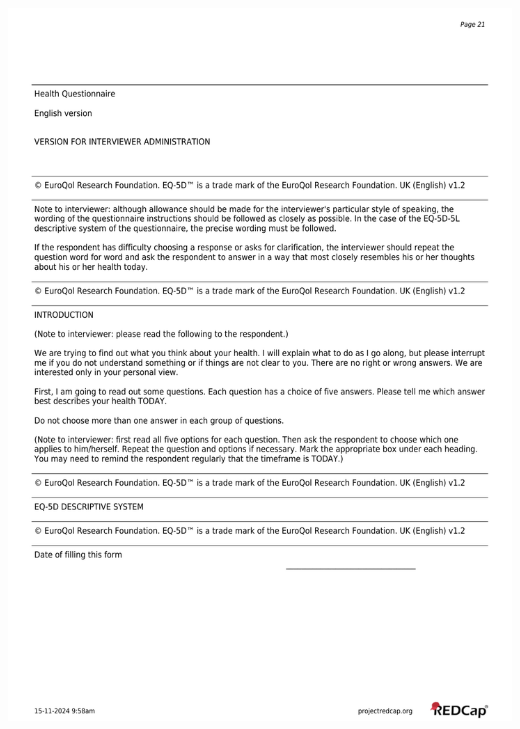 \documentclass[
]{scrartcl}
\begin{document}
\includegraphics{../case-record-form/instrument-pdfs/pages/all-instruments-21.pdf}
\end{document}
